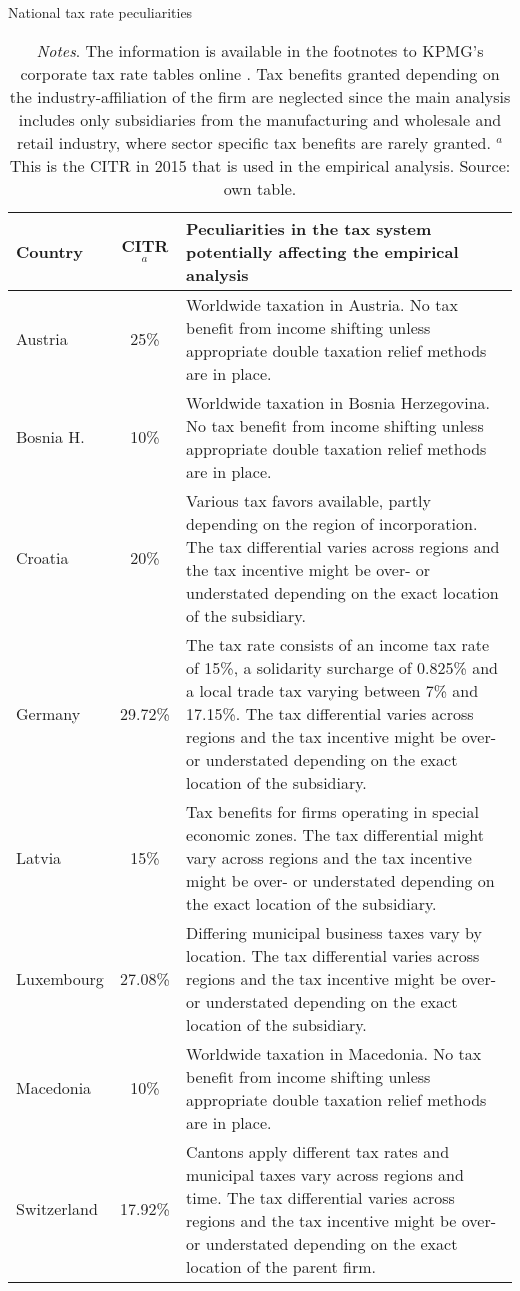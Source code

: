 \documentclass[10pt,twocolumn,oneside,cmyk]{article}
\begin{document}
\begin{table}[t]
\scriptsize
 \begin{center}
  \caption{National tax rate peculiarities}\label{tab18}
   \begin{tabularx}{\linewidth}{l c X}
   \toprule
   Country & CITR$^a$ &Peculiarities in the tax system potentially affecting the empirical analysis\\
   \midrule
   Austria &25\% &Worldwide taxation in Austria. No tax benefit from income shifting unless appropriate double taxation relief methods are in place.\\
   Bosnia H. &10\% &Worldwide taxation in Bosnia Herzegovina. No tax benefit from income shifting unless appropriate double taxation relief methods are in place.\\
   Croatia &20\% &Various tax favors available, partly depending on the region of incorporation. The tax differential varies across regions and the tax incentive might be over- or understated depending on the exact location of the subsidiary.\\
   Germany &29.72\% &The tax rate consists of an income tax rate of 15\%, a solidarity surcharge of 0.825\% and a local trade tax varying between 7\% and 17.15\%. The tax differential varies across regions and the tax incentive might be over- or understated depending on the exact location of the subsidiary.\\
   Latvia & 15\% &Tax benefits for firms operating in special economic zones. The tax differential might vary across regions and the tax incentive might be over- or understated depending on the exact location of the subsidiary.\\
   Luxembourg &27.08\% &Differing municipal business taxes vary by location. The tax differential varies across regions and the tax incentive might be over- or understated depending on the exact location of the subsidiary.\\
   Macedonia &10\% &Worldwide taxation in Macedonia. No tax benefit from income shifting unless appropriate double taxation relief methods are in place.\\
   Switzerland &17.92\% &Cantons apply different tax rates and municipal taxes vary across regions and time. The tax differential varies across regions and the tax incentive might be over- or understated depending on the exact location of the parent firm.\\
   \bottomrule
   \end{tabularx}
  \caption*{\footnotesize{\textit{Notes}. The information is available in the footnotes to KPMG's corporate tax rate tables online \parencite{kpmg_corporate_2017}. Tax benefits granted depending on the industry-affiliation of the firm are neglected since the main analysis includes only subsidiaries from the manufacturing and wholesale and retail industry, where sector specific tax benefits are rarely granted. $^a$This is the CITR in 2015 that is used in the empirical analysis. Source: own table.}}
 \end{center}
\end{table}
\end{document}
